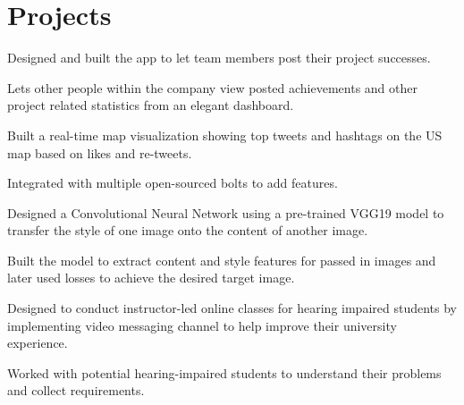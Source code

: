 \documentclass[]{rinkal_resume}
\begin{document}
\begin{minipage}[t]{0.69\textwidth}
\section{Projects}
\begin{tightemize}
\item Designed and built the app to let team members post their project successes.
\item Lets other people within the company view posted achievements and other project related statistics from an elegant dashboard.
\end{tightemize}
\smallsectionsep

\begin{tightemize}
\item Built a real-time map visualization showing top tweets and hashtags on the US map based on likes and re-tweets.
\item Integrated with multiple open-sourced bolts to add features.
\end{tightemize}
\smallsectionsep

\begin{tightemize}
\item Designed a Convolutional Neural Network using a pre-trained VGG19 model to transfer the style of one image onto the content of another image.
\item Built the model to extract content and style features for passed in images and later used losses to achieve the desired target image.
\end{tightemize}
\smallsectionsep

\begin{tightemize}
\item Designed to conduct instructor-led online classes for hearing impaired students by implementing video messaging channel to help improve their university experience.
\item Worked with potential hearing-impaired students to understand their problems and collect requirements.
\end{tightemize}
\smallsectionsep


\end{minipage}
\end{document}

